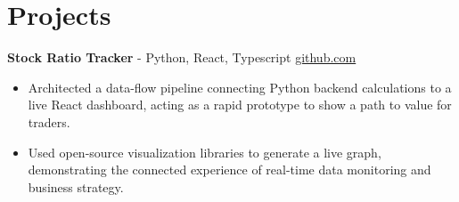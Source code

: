 \documentclass[11pt]{article}       %
\begin{document}

\vspace{-18.5pt}

\section*{Projects}

\textbf{Stock Ratio Tracker}{ - Python, React, Typescript} \hfill \href{https://github.com/Monica20030707/tradingDashboard-UI}{github.com} \\
\vspace{-9pt}
\begin{itemize}
  \item Architected a data-flow pipeline connecting Python backend calculations to a live React dashboard, acting as a rapid prototype to show a path to value for traders. 
  \item Used open-source visualization libraries to generate a live graph, demonstrating the connected experience of real-time data monitoring and business strategy.
\end{itemize}

\end{document}
